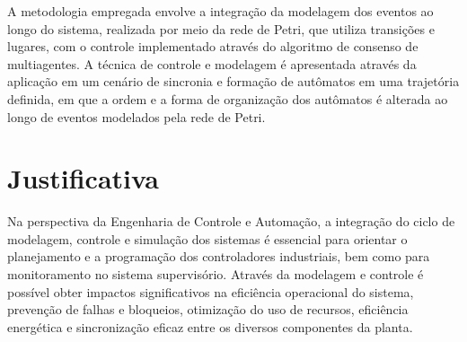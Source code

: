 A metodologia empregada envolve a integração da modelagem dos eventos ao longo do sistema, realizada por meio da rede de Petri, que utiliza transições e lugares, com o controle implementado através do algoritmo de consenso de multiagentes. A técnica de controle e modelagem é apresentada através da aplicação em um cenário de sincronia e formação de autômatos em uma trajetória definida, em que a ordem e a forma de organização dos autômatos é alterada ao longo de eventos modelados pela rede de Petri.






\section{Justificativa}
Na perspectiva da Engenharia de Controle e Automação, a integração do ciclo de modelagem, controle e simulação dos sistemas é essencial para orientar o planejamento e a programação dos controladores industriais, bem como para monitoramento no sistema supervisório. Através da modelagem e controle é possível obter impactos significativos na eficiência operacional do sistema, prevenção de falhas e bloqueios, otimização do uso de recursos, eficiência energética e sincronização eficaz entre os diversos componentes da planta. 

